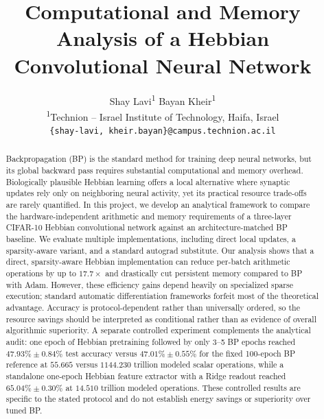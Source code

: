 \documentclass{article}
\title{Computational and Memory Analysis of a Hebbian Convolutional Neural Network}
\author{%
      Shay Lavi\textsuperscript{1} \quad
      Bayan Kheir\textsuperscript{1} \\
      \textsuperscript{1}Technion -- Israel Institute of Technology, Haifa, Israel \\
      \texttt{\{shay-lavi, kheir.bayan\}@campus.technion.ac.il} \quad
    }
\begin{document}
    \maketitle
    \begin{abstract}

Backpropagation (BP) is the standard method for training deep neural networks, but its global backward pass requires substantial computational and memory overhead. Biologically plausible Hebbian learning offers a local alternative where synaptic updates rely only on neighboring neural activity, yet its practical resource trade-offs are rarely quantified. In this project, we develop an analytical framework to compare the hardware-independent arithmetic and memory requirements of a three-layer CIFAR-10 Hebbian convolutional network against an architecture-matched BP baseline. We evaluate multiple implementations, including direct local updates, a sparsity-aware variant, and a standard autograd substitute. Our analysis shows that a direct, sparsity-aware Hebbian implementation can reduce per-batch arithmetic operations by up to $17.7\times$ and drastically cut persistent memory compared to BP with Adam. However, these efficiency gains depend heavily on specialized sparse execution; standard automatic differentiation frameworks forfeit most of the theoretical advantage. {\color{red}Accuracy is protocol-dependent rather than universally ordered, so the resource savings should be interpreted as conditional rather than as evidence of overall algorithmic superiority. A separate controlled experiment complements the analytical audit: one epoch of Hebbian pretraining followed by only 3--5 BP epochs reached $47.93\% \pm 0.84\%$ test accuracy versus $47.01\% \pm 0.55\%$ for the fixed 100-epoch BP reference at $55.665$ versus $1144.230$ trillion modeled scalar operations, while a standalone one-epoch Hebbian feature extractor with a Ridge readout reached $65.04\% \pm 0.30\%$ at $14.510$ trillion modeled operations. These controlled results are specific to the stated protocol and do not establish energy savings or superiority over tuned BP.}
    
    

\end{abstract}
\end{document}
